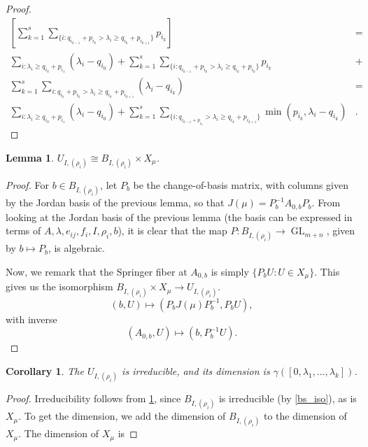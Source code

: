 \documentclass[12pt,psamsfonts]{article}
\DeclareMathOperator{\GL}{GL}
\newtheorem{lemma}[theorem]{Lemma}
\newtheorem{corollary}[theorem]{Corollary}
\begin{document}
\begin{proof}
\begin{align*}
        \left[\sum_{k = 1}^s \sum_{\{i : q_{i_{k - 1}} + p_{i_k} > \lambda_i \geq q_{i_k} + p_{i_{k + 1}}\}} p_{i_k}\right] & = \\
        \sum_{i : \lambda_i \geq q_{i_0} + p_{i_1}} (\lambda_i - q_{i_0}) + \sum_{k = 1}^s \sum_{\{i : q_{i_{k - 1}} + p_{i_k} > \lambda_i \geq q_{i_k} + p_{i_k}\}} p_{i_k} & + \\
        \sum_{k = 1}^s \sum_{i : q_{i_k} + p_{i_k} > \lambda_i \geq q_{i_k} + p_{i_{k + 1}}} (\lambda_i - q_{i_k}) & = \\
        \sum_{i : \lambda_i \geq q_{i_0} + p_{i_1}} (\lambda_i - q_{i_0}) + \sum_{k = 1}^s \sum_{\{i : q_{i_{k - 1} + p_{i_k}} > \lambda_i \geq q_{i_k} + p_{i_{k + 1}}\}} \min(p_{i_k}, \lambda_i - q_{i_k}) & .
    \end{align*}    
\end{proof}

\begin{lemma}\label{u_i_rho_iso}
    \(U_{I, (\rho_i)} \cong B_{I, (\rho_i)} \times X_\mu\).
\end{lemma}
\begin{proof}
    For \(b \in B_{I, (\rho_i)}\), let \(P_b\) be the change-of-basis matrix, with columns given by the Jordan basis of the previous lemma, so that \(J(\mu) = P_b^{-1} A_{0,b} P_b\).
    From looking at the Jordan basis of the previous lemma (the basis can be expressed in terms of \(A, \lambda, e_{ij}, f_i, I, \rho_i, b\)), it is clear that the map \(P : B_{I, (\rho_i)} \to \GL_{m + n}\), given by \(b \mapsto P_b\), is algebraic.
    \par Now, we remark that the Springer fiber at \(A_{0,b}\) is simply \(\{P_b U : U \in X_\mu\}\).
    This gives us the isomorphism \(B_{I, (\rho_i)} \times X_\mu \to U_{I, (\rho_i)}\).
    \[(b, U) \mapsto (P_b J(\mu) P_b^{-1}, P_b U),\]
    with inverse
    \[(A_{0,b}, U) \mapsto (b, P_b^{-1} U).\]
\end{proof}

\begin{corollary}\label{u_i_rho_irred_and_dim}
    The 
    \(U_{I, (\rho_i)}\) is irreducible, and its dimension is \(\gamma([0, \lambda_1, ..., \lambda_k])\).
\end{corollary}
\begin{proof}
    Irreducibility follows from \cref{u_i_rho_iso}, since \(B_{I, (\rho_i)}\) is irreducible (by \cref{bs_iso}), as is \(X_\mu\).
    To get the dimension, we add the dimension of \(B_{I, (\rho_i)}\) to the dimension of \(X_\mu\).
    The dimension of \(X_\mu\) is 
\end{proof}
\end{document}
